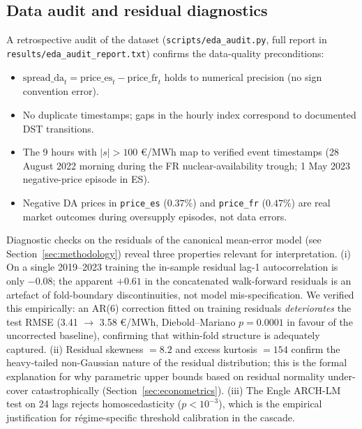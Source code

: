 \documentclass[11pt,a4paper]{article}
\begin{document}
\subsection{Data audit and residual diagnostics}\label{sec:eda}

A retrospective audit of the dataset
(\texttt{scripts/eda\_audit.py}, full report in
\texttt{results/eda\_audit\_report.txt}) confirms the data-quality
preconditions:

\begin{itemize}
\item $\mathrm{spread\_da}_t = \mathrm{price\_es}_t -
\mathrm{price\_fr}_t$ holds to numerical precision (no sign
convention error).
\item No duplicate timestamps; gaps in the hourly index correspond
to documented DST transitions.
\item The 9 hours with $|s| > 100$ €/MWh map to verified event
timestamps (28 August 2022 morning during the FR nuclear-availability
trough; 1 May 2023 negative-price episode in ES).
\item Negative DA prices in \texttt{price\_es} ($0.37\%$) and
\texttt{price\_fr} ($0.47\%$) are real market outcomes during
oversupply episodes, not data errors.
\end{itemize}

Diagnostic checks on the residuals of the canonical mean-error model
(see Section~\ref{sec:methodology}) reveal three properties relevant
for interpretation. (i) On a single 2019--2023 training the
in-sample residual lag-1 autocorrelation is only $-0.08$; the
apparent $+0.61$ in the concatenated walk-forward residuals is an
artefact of fold-boundary discontinuities, not model
mis-specification. We verified this empirically: an AR(6) correction
fitted on training residuals \emph{deteriorates} the test RMSE
(3.41 $\to$ 3.58 €/MWh, Diebold--Mariano $p = 0.0001$ in favour of
the uncorrected baseline), confirming that within-fold structure is
adequately captured. (ii) Residual skewness $= 8.2$ and excess
kurtosis $= 154$ confirm the heavy-tailed non-Gaussian nature of the
residual distribution; this is the formal explanation for why
parametric upper bounds based on residual normality under-cover
catastrophically (Section~\ref{sec:econometrics}). (iii) The Engle
ARCH-LM test on 24 lags rejects homoscedasticity
($p < 10^{-3}$), which is the empirical justification for
régime-specific threshold calibration in the cascade.

\end{document}

